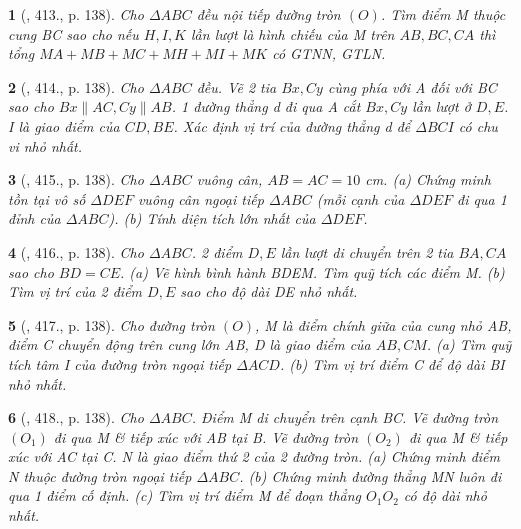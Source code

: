 \documentclass{article}
\newtheorem{baitoan}{}
\begin{document}
\begin{baitoan}[\cite{Binh_Toan_9_tap_2}, 413., p. 138]
	Cho $\Delta ABC$ đều nội tiếp đường tròn $(O)$. Tìm điểm M thuộc cung BC sao cho nếu $H,I,K$ lần lượt là hình chiếu của M trên $AB,BC,CA$ thì tổng $MA + MB + MC + MH + MI + MK$ có {\rm GTNN, GTLN}.
\end{baitoan}

\begin{baitoan}[\cite{Binh_Toan_9_tap_2}, 414., p. 138]
	Cho $\Delta ABC$ đều. Vẽ 2 tia $Bx,Cy$ cùng phía với A đối với BC sao cho $Bx\parallel AC,Cy\parallel AB$. 1 đường thẳng d đi qua A cắt $Bx,Cy$ lần lượt ở $D,E$. I là giao điểm của $CD,BE$. Xác định vị trí của đường thẳng d để $\Delta BCI$ có chu vi nhỏ nhất.
\end{baitoan}

\begin{baitoan}[\cite{Binh_Toan_9_tap_2}, 415., p. 138]
	Cho $\Delta ABC$ vuông cân, $AB = AC = 10$ {\rm cm}. (a) Chứng minh tồn tại vô số $\Delta DEF$ vuông cân ngoại tiếp $\Delta ABC$ (mỗi cạnh của $\Delta DEF$ đi qua 1 đỉnh của $\Delta ABC$). (b) Tính diện tích lớn nhất của $\Delta DEF$.
\end{baitoan}

\begin{baitoan}[\cite{Binh_Toan_9_tap_2}, 416., p. 138]
	Cho $\Delta ABC$. 2 điểm $D,E$ lần lượt di chuyển trên 2 tia $BA,CA$ sao cho $BD = CE$. (a) Vẽ hình bình hành BDEM. Tìm quỹ tích các điểm M. (b) Tìm vị trí của 2 điểm $D,E$ sao cho độ dài DE nhỏ nhất.
\end{baitoan}

\begin{baitoan}[\cite{Binh_Toan_9_tap_2}, 417., p. 138]
	Cho đường tròn $(O)$, M là điểm chính giữa của cung nhỏ AB, điểm C chuyển động trên cung lớn AB, D là giao điểm của $AB,CM$. (a) Tìm quỹ tích tâm I của đường tròn ngoại tiếp $\Delta ACD$. (b) Tìm vị trí điểm C để độ dài BI nhỏ nhất.
\end{baitoan}

\begin{baitoan}[\cite{Binh_Toan_9_tap_2}, 418., p. 138]
	Cho $\Delta ABC$. Điểm M di chuyển trên cạnh BC. Vẽ đường tròn $(O_1)$ đi qua M \& tiếp xúc với AB tại B. Vẽ đường tròn $(O_2)$ đi qua M \& tiếp xúc với AC tại C. N là giao điểm thứ 2 của 2 đường tròn. (a) Chứng minh điểm N thuộc đường tròn ngoại tiếp $\Delta ABC$. (b) Chứng minh đường thẳng MN luôn đi qua 1 điểm cố định. (c) Tìm vị trí điểm M để đoạn thẳng $O_1O_2$ có độ dài nhỏ nhất.
\end{baitoan}
\end{document}
